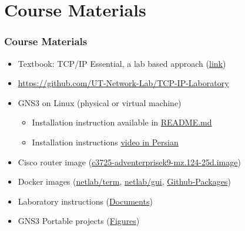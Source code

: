 \documentclass[aspectratio=169,15pt]{beamer}
\begin{document}
\section{Course Materials}
\begin{frame}
    \frametitle{Course Materials}

    \begin{itemize}
        \item Textbook: TCP/IP Essential, a lab based approach (\href{https://github.com/UT-Network-Lab/TCP-IP-Laboratory/blob/master/References/TCP-IP\%20Essentials.pdf}{link})
        \item \url{https://github.com/UT-Network-Lab/TCP-IP-Laboratory}
        \item GNS3 on Linux (physical or virtual machine)
        \begin{itemize}
            \item Installation instruction available in \href{https://github.com/UT-Network-Lab/TCP-IP-Laboratory/blob/master/README.md}{README.md}
            \item Installation instructions \href{https://www.dropbox.com/s/bad8eongryfnylr/GNS3\%20Installation\%20Tutorial.mp4?dl=0}{video in Persian}
        \end{itemize}
        \item Cisco router image (\href{https://github.com/UT-Network-Lab/gns3-figures/blob/main/Cisco/c3725-adventerprisek9-mz.124-25d.image}{c3725-adventerprisek9-mz.124-25d.image})
        \item Docker images (\href{https://hub.docker.com/r/utnetlab/term}{netlab/term}, \href{https://hub.docker.com/r/utnetlab/gui}{netlab/gui}, \href{https://github.com/orgs/UT-Network-Lab/packages?repo_name=docker-tools}{Github-Packages})
        \item Laboratory instructions (\href{https://github.com/UT-Network-Lab/TCP-IP-Laboratory/releases/latest}{Documents})
        \item GNS3 Portable projects (\href{https://github.com/UT-Network-Lab/gns3-figures/releases/latest}{Figures})
    \end{itemize}

\end{frame}
\end{document}
